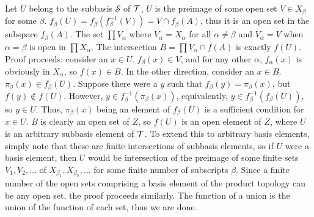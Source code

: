 \documentclass[12pt,letterpaper]{article}
\begin{document}
\begin{enumerate}
\begin{enumerate}
    \indent %
    Let $U$ belong to the subbasis $\mathcal{S}$ of $\mathcal{T}$, $U$ is the preimage of some open set $V\in X_\beta$ for some $\beta$. $f_\beta(U) = f_\beta(f_\beta^{-1}(V)) = V \cap f_\beta(A)$, thus it is an open set in the subspace $f_\beta(A)$.\n
    The set $\prod V_\alpha$ where $V_\alpha = X_\alpha$ for all $\alpha \neq \beta$ and $V_\alpha=V$ when $\alpha=\beta$ is open in $\prod X_\alpha$. The intersection $B = \prod V_\alpha\cap f(A)$ is exactly $f(U)$. Proof proceeds: consider an $x\in U$. $f_\beta(x) \in V$, and for any other $\alpha$, $f_\alpha(x)$ is obviously in $X_\alpha$, so $f(x)\in B$. In the other direction, consider an $x\in B$. $\pi_\beta(x) \in f_\beta(U)$. Suppose there were a $y$ such that $f_\beta(y)=\pi_\beta(x)$, but $f(y)\not\in f(U)$. However, $y\in f^{-1}_\beta(\pi_\beta(x))$, equivalently, $y\in f^{-1}_\beta(f_\beta(U))$, so $y\in U$. Thus, $\pi_\beta(x)$ being an element of $f_\beta(U)$ is a sufficient condition for $x\in U$. %
    $B$ is clearly an open set of $Z$, so $f(U)$ is an open element of $Z$, where $U$ is an arbitrary subbasis element of $\mathcal{T}$. To extend this to arbitrary basis elements, simply note that these are finite intersections of subbasis elements, so if $U$ were a basis element, then $U$ would be intersection of the preimage of some finite sets $V_1, V_2,\dots$ of $X_{\beta_1},X_{\beta_2},\dots$ for some finite number of subscripts $\beta$. Since a finite number of the open sets comprising a basis element of the product topology can be any open set, the proof proceeds similarly. The function of a union is the union of the function of each set, thus we are done.
  \end{enumerate}
\end{enumerate}
\end{document}
